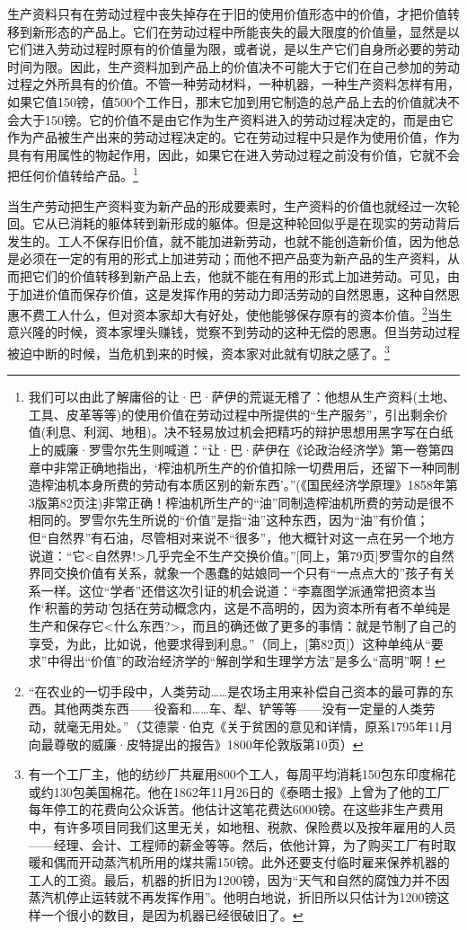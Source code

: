 \documentclass{ctexbook}
\begin{document}
生产资料只有在劳动过程中丧失掉存在于旧的使用价值形态中的价值，才把价值转移到新形态的产品上。它们在劳动过程中所能丧失的最大限度的价值量，显然是以它们进入劳动过程时原有的价值量为限，或者说，是以生产它们自身所必要的劳动时间为限。因此，生产资料加到产品上的价值决不可能大于它们在自己参加的劳动过程之外所具有的价值。不管一种劳动材料，一种机器，一种生产资料怎样有用，如果它值150镑，值500个工作日，那末它加到用它制造的总产品上去的价值就决不会大于150镑。它的价值不是由它作为生产资料进入的劳动过程决定的，而是由它作为产品被生产出来的劳动过程决定的。它在劳动过程中只是作为使用价值，作为具有有用属性的物起作用，因此，如果它在进入劳动过程之前没有价值，它就不会把任何价值转给产品。\footnote{我们可以由此了解庸俗的让·巴·萨伊的荒诞无稽了：他想从生产资料(土地、工具、皮革等等)的使用价值在劳动过程中所提供的“生产服务”，引出剩余价值(利息、利润、地租)。决不轻易放过机会把精巧的辩护思想用黑字写在白纸上的威廉·罗雪尔先生则喊道：“让·巴·萨伊在《论政治经济学》第一卷第四章中非常正确地指出，‘榨油机所生产的价值扣除一切费用后，还留下一种同制造榨油机本身所费的劳动有本质区别的新东西’。”(《国民经济学原理》1858年第3版第82页注)非常正确！榨油机所生产的“油”同制造榨油机所费的劳动是很不相同的。罗雪尔先生所说的“价值”是指“油”这种东西，因为“油”有价值；但“自然界”有石油，尽管相对来说不“很多”，他大概针对这一点在另一个地方说道：“它<自然界!>几乎完全不生产交换价值。”[同上，第79页]罗雪尔的自然界同交换价值有关系，就象一个愚蠢的姑娘同一个只有“一点点大的”孩子有关系一样。这位“学者”还借这次引证的机会说道：“李嘉图学派通常把资本当作‘积蓄的劳动’包括在劳动概念内，这是不高明的，因为资本所有者不单纯是生产和保存它<什么东西?>，而且的确还做了更多的事情：就是节制了自己的享受，为此，比如说，他要求得到利息。”（同上，[第82页]）这种单纯从“要求”中得出“价值”的政治经济学的“解剖学和生理学方法”是多么“高明”啊！}

当生产劳动把生产资料变为新产品的形成要素时，生产资料的价值也就经过一次轮回。它从已消耗的躯体转到新形成的躯体。但是这种轮回似乎是在现实的劳动背后发生的。工人不保存旧价值，就不能加进新劳动，也就不能创造新价值，因为他总是必须在一定的有用的形式上加进劳动；而他不把产品变为新产品的生产资料，从而把它们的价值转移到新产品上去，他就不能在有用的形式上加进劳动。可见，由于加进价值而保存价值，这是发挥作用的劳动力即活劳动的自然恩惠，这种自然恩惠不费工人什么，但对资本家却大有好处，使他能够保存原有的资本价值。\footnote{“在农业的一切手段中，人类劳动……是农场主用来补偿自己资本的最可靠的东西。其他两类东西——役畜和……车、犁、铲等等——没有一定量的人类劳动，就毫无用处。”（艾德蒙·伯克《关于贫困的意见和详情，原系1795年11月向最尊敬的威廉·皮特提出的报告》1800年伦敦版第10页）}当生意兴隆的时候，资本家埋头赚钱，觉察不到劳动的这种无偿的恩惠。但当劳动过程被迫中断的时候，当危机到来的时候，资本家对此就有切肤之感了。\footnote{有一个工厂主，他的纺纱厂共雇用800个工人，每周平均消耗150包东印度棉花或约130包美国棉花。他在1862年11月26日的《泰晤士报》上曾为了他的工厂每年停工的花费向公众诉苦。他估计这笔花费达6000镑。在这些非生产费用中，有许多项目同我们这里无关，如地租、税款、保险费以及按年雇用的人员——经理、会计、工程师的薪金等等。然后，依他计算，为了购买工厂有时取暖和偶而开动蒸汽机所用的煤共需150镑。此外还要支付临时雇来保养机器的工人的工资。最后，机器的折旧为1200镑，因为“天气和自然的腐蚀力并不因蒸汽机停止运转就不再发挥作用”。他明白地说，折旧所以只估计为1200镑这样一个很小的数目，是因为机器已经很破旧了。}
\end{document}
